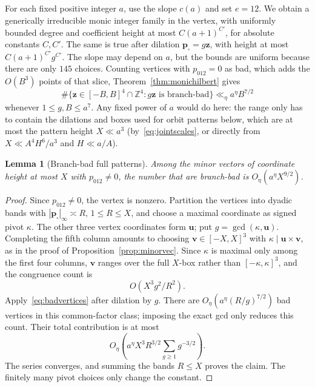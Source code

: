 \documentclass[11pt]{article}
\newtheorem{lemma}[theorem]{Lemma}
\theoremstyle{definition}
\theoremstyle{remark}
\begin{document}
For each fixed positive integer $a$, use the slope $c(a)$ and set $e=12$.
We obtain a generically irreducible monic integer family in the vertex,
with uniformly bounded degree and coefficient height at most $C(a+1)^{C'}$,
for absolute constants $C,C'$. The same is true after dilation
$\mathbf p_\square=g\mathbf z$, with height at most $C(a+1)^{C'}g^{C'}$.
The slope may depend on $a$, but the bounds are uniform because there are
only $145$ choices. Counting vertices with $p_{012}=0$ as bad, which adds the
$O(B^3)$ points of that slice, Theorem~\ref{thm:monichilbert} gives
\begin{equation}\label{eq:badvertices}
 \#\{\mathbf z\in[-B,B]^4\cap\mathbb Z^4:
                  g\mathbf z\text{ is branch-bad}\}
 \ll_\eta a^\eta B^{7/2}
\end{equation}
whenever $1\le g,B\le a^7$. Any fixed power of $a$ would do here: the
range only has to contain the dilations and boxes used for orbit patterns
below, which are at most the pattern height $X\ll a^3$
(by~\eqref{eq:jointscales}, or directly from $X\ll A^4H^6/a^3$ and
$H\ll a/A$).

\begin{lemma}[Branch-bad full patterns]\label{lem:branchpatterns}
Among the minor vectors of coordinate height at most $X$ with $p_{012}\ne0$,
the number that are branch-bad is $O_\eta(a^\eta X^{9/2})$.
\end{lemma}
\begin{proof}
Since $p_{012}\ne0$, the vertex is nonzero. Partition the vertices into dyadic
bands with $|\mathbf p_\square|_\infty\asymp R$, $1\le R\le X$, and choose a maximal coordinate as signed pivot $\kappa$.
The other three vertex coordinates form $\mathbf u$; put
$g=\gcd(\kappa,\mathbf u)$. Completing the fifth column amounts to choosing
$\mathbf v\in[-X,X]^3$ with $\kappa\mid\mathbf u\times\mathbf v$, as in the proof of
Proposition~\ref{prop:minorvec}. Since $\kappa$ is maximal only among the
first four columns, $\mathbf v$ ranges over the full $X$-box rather than
$[-\kappa,\kappa]^3$, and the congruence count is
\[
 O(X^3g^2/R^2).
\]
Apply~\eqref{eq:badvertices} after dilation by $g$.
There are $O_\eta(a^\eta(R/g)^{7/2})$ bad vertices in this common-factor
class; imposing the exact gcd only reduces this count. Their total
contribution is at most
\[
 O_\eta\left(a^\eta X^3R^{3/2}\sum_{g\ge1}g^{-3/2}\right).
\]
The series converges, and summing the bands $R\le X$ proves the claim.
The finitely many pivot choices only change the constant.
\end{proof}
\end{document}
